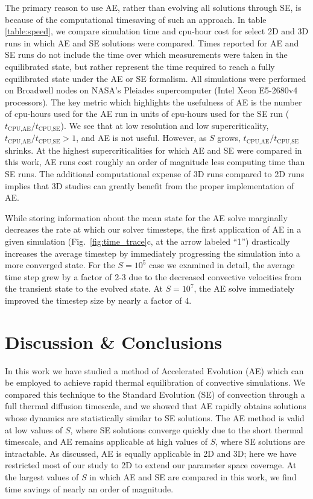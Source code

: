 \documentclass[aps, pre, onecolumn, nofootinbib, notitlepage, groupedaddress, amsfonts, amssymb, amsmath, longbibliography]{revtex4-1}
\begin{document}
The primary reason to use AE, rather than evolving all solutions through SE,
is because of the computational timesaving of such an approach. In table 
\ref{table:speed}, we compare simulation time and cpu-hour cost for select
2D and 3D runs in which AE and SE solutions were compared. Times reported
for AE and SE runs do not include the time over which measurements were taken
in the equilibrated state, but rather represent the time required to reach a
fully equilibrated state under the AE or SE formalism. All simulations
were performed on Broadwell nodes on NASA's Pleiades supercomputer 
(Intel Xeon E5-2680v4 processors). The key metric which highlights the usefulness
of AE is the number of cpu-hours used for the AE run in units of cpu-hours used
for the SE run ($t_{\text{CPU,AE}}/t_{\text{CPU,SE}}$). We see that at low
resolution and low supercriticality, $t_{\text{CPU,AE}}/t_{\text{CPU,SE}} > 1$,
and AE is not useful. However, as $S$ grows, $t_{\text{CPU,AE}}/t_{\text{CPU,SE}}$
shrinks. At the highest supercriticalities for which AE and SE were compared
in this work, AE runs cost roughly an order of magnitude less computing time 
than SE runs.
 The additional computational expense of 3D runs compared
to 2D runs implies that 3D studies can greatly benefit from the proper implementation of AE.



While storing information about the mean state for the AE solve marginally
decreases the rate at which our solver timesteps, the first application of AE in a given
simulation (Fig.~\ref{fig:time_trace}c, at the arrow labeled ``1'') drastically
increases the average timestep by immediately progressing the simulation into
a more converged state. For the $S = 10^5$ case we examined in detail, the
average time step grew by a factor of 2-3 due to the decreased convective
velocities from the transient state to the evolved state. 
At $S = 10^7$, the AE solve immediately improved the timestep size 
by nearly a factor of 4.





\section{Discussion \& Conclusions}
\label{sec:extensions}
In this work we have studied a method of Accelerated Evolution (AE) which can
be employed to achieve rapid thermal equilibration of convective simulations.  We compared
this technique to the Standard Evolution (SE) of convection through a full thermal diffusion timescale,
and we
showed that AE rapidly obtains solutions whose dynamics are statistically similar to SE solutions.
The AE method is valid at low values of $S$, where SE solutions
converge quickly due to the short thermal timescale, and AE remains applicable
at high values of $S$, where SE solutions are intractable.
As discussed, AE is equally applicable in 2D and 3D; here we have restricted most of our study to 2D
to extend our parameter space coverage.
At the largest values of $S$ in which AE and SE are compared in this work, we find
time savings of nearly an order of magnitude. 
\end{document}
